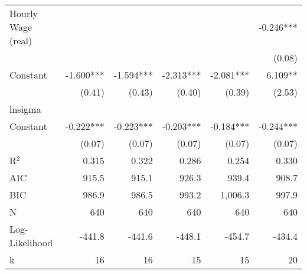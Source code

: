 {\begin{tabular}{l*{5}{r}}
Hourly Wage (real)  &               &               &               &               &      -0.246***\\
                    &               &               &               &               &      (0.08)   \\
Constant               &      -1.600***&      -1.594***&      -2.313***&      -2.081***&       6.109** \\
                    &      (0.41)   &      (0.43)   &      (0.40)   &      (0.39)   &      (2.53)   \\
\hline
lnsigma             &               &               &               &               &               \\
Constant               &      -0.222***&      -0.223***&      -0.203***&      -0.184***&      -0.244***\\
                    &      (0.07)   &      (0.07)   &      (0.07)   &      (0.07)   &      (0.07)   \\
\hline
R$^2$                  &       0.315   &       0.322   &       0.286   &       0.254   &       0.330   \\
AIC                 &       915.5   &       915.1   &       926.3   &       939.4   &       908.7   \\
BIC                 &       986.9   &       986.5   &       993.2   &     1,006.3   &       997.9   \\
N                   &         640   &         640   &         640   &         640   &         640   \\
Log-Likelihood                  &      -441.8   &      -441.6   &      -448.1   &      -454.7   &      -434.4   \\
k                   &          16   &          16   &          15   &          15   &          20   \\
\hline\hline
\end{tabular}
}
